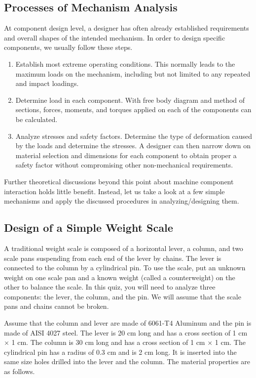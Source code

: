 \documentclass[a4paper,openany,nobib]{tufte-book}
\begin{document}
{{\subsection{Processes of Mechanism Analysis}
\label{processes-of-mechanism-analysis}
At component design level, a designer has often already established
requirements and overall shapes of the intended mechanism. In order to
design specific components, we usually follow these steps.

\begin{enumerate}
\item Establish most extreme operating conditions. This normally leads to
the maximum loads on the mechanism, including but not limited to any
repeated and impact loadings.

\item Determine load in each component. With free body diagram and method
of sections, forces, moments, and torques applied on each of the
components can be calculated.

\item Analyze stresses and safety factors. Determine the type of
deformation caused by the loads and determine the stresses. A
designer can then narrow down on material selection and dimensions
for each component to obtain proper a safety factor without
compromising other non-mechanical requirements.
\end{enumerate}

Further theoretical discussions beyond this point about machine
component interaction holds little benefit. Instead, let us take a look
at a few simple mechanisms and apply the discussed procedures in
analyzing/designing them.

\subsection{Design of a Simple Weight Scale}
\label{design-of-a-simple-weight-scale}
A traditional weight scale is composed of a horizontal lever, a column,
and two scale pans suspending from each end of the lever by chains. The
lever is connected to the column by a cylindrical pin. To use the scale,
put an unknown weight on one scale pan and a known weight (called a
counterweight) on the other to balance the scale. In this quiz, you will
need to analyze three components: the lever, the column, and the pin. We
will assume that the scale pans and chains cannot be broken.


Assume that the column and lever are made of 6061-T4 Aluminum and the
pin is made of AISI 4027 steel. The lever is 20 cm long and has a cross
section of 1 cm \(\times\) 1 cm. The column is 30 cm long and has a cross
section of 1 cm \(\times\) 1 cm. The cylindrical pin has a radius of 0.3
cm and is 2 cm long. It is inserted into the same size holes drilled
into the lever and the column. The material properties are as follows.


}}
\end{document}
